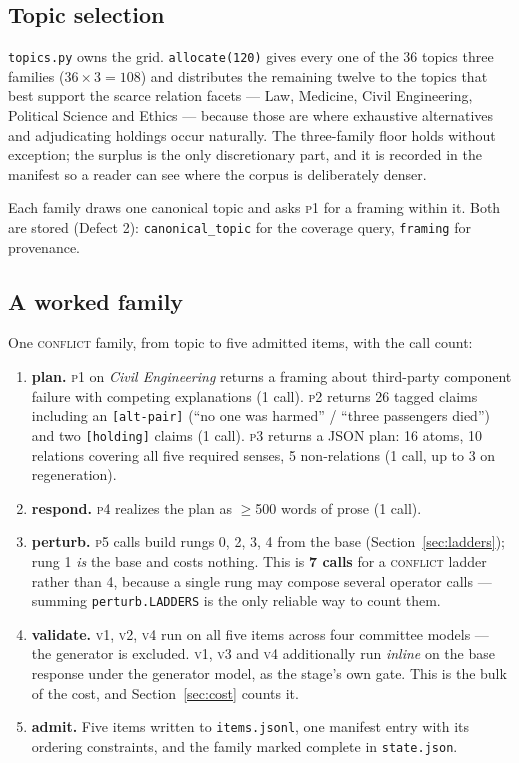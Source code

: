 \documentclass[11pt]{article}
\newcommand{\pymod}[1]{\texttt{#1}}
\begin{document}
\subsection{Topic selection}

\pymod{topics.py} owns the grid. \texttt{allocate(120)} gives every one of the 36 topics three
families ($36 \times 3 = 108$) and distributes the remaining twelve to the topics that best support
the scarce relation facets --- Law, Medicine, Civil Engineering, Political Science and Ethics ---
because those are where exhaustive alternatives and adjudicating holdings occur naturally. The
three-family floor holds without exception; the surplus is the only discretionary part, and it is
recorded in the manifest so a reader can see where the corpus is deliberately denser.

Each family draws one canonical topic and asks \textsc{p1} for a framing within it. Both are
stored (Defect 2): \texttt{canonical\_topic} for the coverage query,
\texttt{framing} for provenance.

\subsection{A worked family}

One \textsc{conflict} family, from topic to five admitted items, with the call count:

\begin{enumerate}[leftmargin=*,nosep,label=\arabic*.]
  \item \textbf{plan.} \textsc{p1} on \emph{Civil Engineering} returns a framing about
        third-party component failure with competing explanations (1 call). \textsc{p2} returns 26
        tagged claims including an \texttt{[alt-pair]} (``no one was harmed'' / ``three passengers
        died'') and two \texttt{[holding]} claims (1 call). \textsc{p3} returns a JSON plan: 16
        atoms, 10 relations covering all five required senses, 5 non-relations (1 call, up to 3 on
        regeneration).
  \item \textbf{respond.} \textsc{p4} realizes the plan as $\geq$500 words of prose (1 call).
  \item \textbf{perturb.} \textsc{p5} calls build rungs 0, 2, 3, 4 from the base
        (Section~\ref{sec:ladders}); rung 1 \emph{is} the base and costs nothing. This is
        \textbf{7 calls} for a \textsc{conflict} ladder rather than 4, because a single rung may
        compose several operator calls --- summing \pymod{perturb.LADDERS} is the only reliable way
        to count them.
  \item \textbf{validate.} \textsc{v1}, \textsc{v2}, \textsc{v4} run on all five items across
        four committee models --- the generator is excluded. \textsc{v1}, \textsc{v3} and
        \textsc{v4} additionally run \emph{inline} on the base response under the generator model,
        as the stage's own gate. This is the bulk of the cost, and Section~\ref{sec:cost} counts it.
  \item \textbf{admit.} Five items written to \texttt{items.jsonl}, one manifest entry with its
        ordering constraints, and the family marked complete in \texttt{state.json}.
\end{enumerate}
\end{document}
